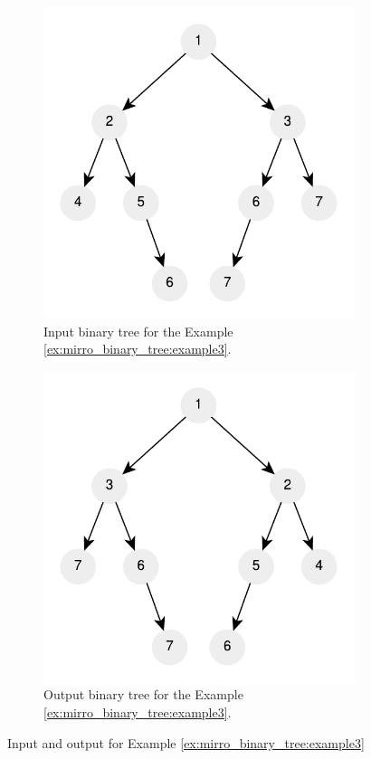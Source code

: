 \begin{figure}
	\centering
	\begin{subfigure}[b]{0.4\textwidth}
		\includegraphics[]{sources/mirror_binary_tree/images/example3}
		\caption{Input binary tree for the Example \ref{ex:mirro_binary_tree:example3}.}
		\label{fig:mirro_binary_tree:example3}
	 \end{subfigure}
	 \hfill
	 \begin{subfigure}[b]{0.4\textwidth}
		\includegraphics[]{sources/mirror_binary_tree/images/example3_1}
		\caption{Output binary tree for the Example \ref{ex:mirro_binary_tree:example3}.}
		\label{fig:mirro_binary_tree:example3_1}
	 \end{subfigure}
	 \caption[]{Input and output for Example \ref{ex:mirro_binary_tree:example3}}

\end{figure}
